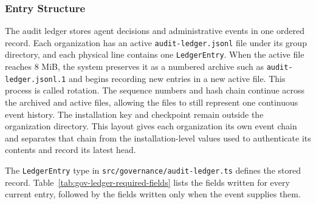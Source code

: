 \subsubsection{Entry Structure}
\label{sec:gov-ledger-entry}

The audit ledger stores agent decisions and administrative events in one ordered record. Each organization has an active \texttt{audit-ledger.jsonl} file under its group directory, and each physical line contains one \texttt{LedgerEntry}. When the active file reaches 8 MiB, the system preserves it as a numbered archive such as \texttt{audit-ledger.jsonl.1} and begins recording new entries in a new active file. This process is called rotation. The sequence numbers and hash chain continue across the archived and active files, allowing the files to still represent one continuous event history. The installation key and checkpoint remain outside the organization directory. This layout gives each organization its own event chain and separates that chain from the installation-level values used to authenticate its contents and record its latest head.

The \texttt{LedgerEntry} type in
\texttt{src/governance/audit-ledger.ts} defines the stored record.
{\color{red}Table~\ref{tab:gov-ledger-required-fields} lists the fields
written for every current entry, followed by the fields written only when the
event supplies them.}

